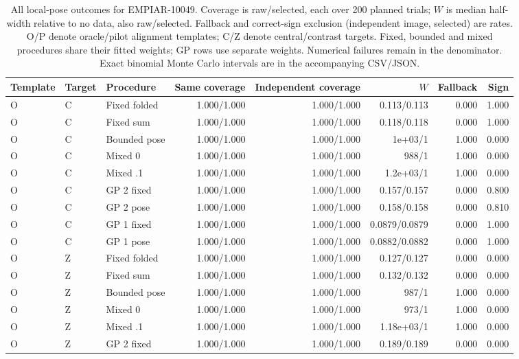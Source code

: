 \begin{table}[!t]
\centering\footnotesize
\caption{All local-pose outcomes for EMPIAR-10049. Coverage is raw/selected, each over 200 planned trials; $W$ is median half-width relative to no data, also raw/selected. Fallback and correct-sign exclusion (independent image, selected) are rates. O/P denote oracle/pilot alignment templates; C/Z denote central/contrast targets. Fixed, bounded and mixed procedures share their fitted weights; GP rows use separate weights. Numerical failures remain in the denominator. Exact binomial Monte Carlo intervals are in the accompanying CSV/JSON.}
\begin{tabular}{lllrrrrr}
\toprule
Template & Target & Procedure & Same coverage & Independent coverage & $W$ & Fallback & Sign \\
\midrule
O & C & Fixed folded & 1.000/1.000 & 1.000/1.000 & 0.113/0.113 & 0.000 & 1.000 \\
O & C & Fixed sum & 1.000/1.000 & 1.000/1.000 & 0.118/0.118 & 0.000 & 1.000 \\
O & C & Bounded pose & 1.000/1.000 & 1.000/1.000 & 1e+03/1 & 1.000 & 0.000 \\
O & C & Mixed 0 & 1.000/1.000 & 1.000/1.000 & 988/1 & 1.000 & 0.000 \\
O & C & Mixed .1 & 1.000/1.000 & 1.000/1.000 & 1.2e+03/1 & 1.000 & 0.000 \\
O & C & GP 2 fixed & 1.000/1.000 & 1.000/1.000 & 0.157/0.157 & 0.000 & 0.800 \\
O & C & GP 2 pose & 1.000/1.000 & 1.000/1.000 & 0.158/0.158 & 0.000 & 0.810 \\
O & C & GP 1 fixed & 1.000/1.000 & 1.000/1.000 & 0.0879/0.0879 & 0.000 & 1.000 \\
O & C & GP 1 pose & 1.000/1.000 & 1.000/1.000 & 0.0882/0.0882 & 0.000 & 1.000 \\
\addlinespace
O & Z & Fixed folded & 1.000/1.000 & 1.000/1.000 & 0.127/0.127 & 0.000 & 0.000 \\
O & Z & Fixed sum & 1.000/1.000 & 1.000/1.000 & 0.132/0.132 & 0.000 & 0.000 \\
O & Z & Bounded pose & 1.000/1.000 & 1.000/1.000 & 987/1 & 1.000 & 0.000 \\
O & Z & Mixed 0 & 1.000/1.000 & 1.000/1.000 & 973/1 & 1.000 & 0.000 \\
O & Z & Mixed .1 & 1.000/1.000 & 1.000/1.000 & 1.18e+03/1 & 1.000 & 0.000 \\
O & Z & GP 2 fixed & 1.000/1.000 & 1.000/1.000 & 0.189/0.189 & 0.000 & 0.000 \\

\end{tabular}
\end{table}
